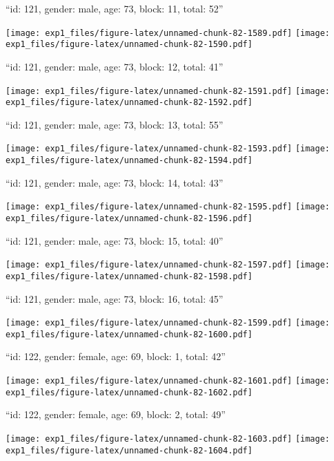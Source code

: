 \documentclass[11pt,,]{article}
\begin{document}
\newpage
[1] 

``id: 121, gender: male, age: 73, block: 11, total: 52''

\texttt{[image: exp1\_files/figure-latex/unnamed-chunk-82-1589.pdf]}
\texttt{[image: exp1\_files/figure-latex/unnamed-chunk-82-1590.pdf]}

\newpage
[1] 

``id: 121, gender: male, age: 73, block: 12, total: 41''

\texttt{[image: exp1\_files/figure-latex/unnamed-chunk-82-1591.pdf]}
\texttt{[image: exp1\_files/figure-latex/unnamed-chunk-82-1592.pdf]}

\newpage
[1] 

``id: 121, gender: male, age: 73, block: 13, total: 55''

\texttt{[image: exp1\_files/figure-latex/unnamed-chunk-82-1593.pdf]}
\texttt{[image: exp1\_files/figure-latex/unnamed-chunk-82-1594.pdf]}

\newpage
[1] 

``id: 121, gender: male, age: 73, block: 14, total: 43''

\texttt{[image: exp1\_files/figure-latex/unnamed-chunk-82-1595.pdf]}
\texttt{[image: exp1\_files/figure-latex/unnamed-chunk-82-1596.pdf]}

\newpage
[1] 

``id: 121, gender: male, age: 73, block: 15, total: 40''

\texttt{[image: exp1\_files/figure-latex/unnamed-chunk-82-1597.pdf]}
\texttt{[image: exp1\_files/figure-latex/unnamed-chunk-82-1598.pdf]}

\newpage
[1] 

``id: 121, gender: male, age: 73, block: 16, total: 45''

\texttt{[image: exp1\_files/figure-latex/unnamed-chunk-82-1599.pdf]}
\texttt{[image: exp1\_files/figure-latex/unnamed-chunk-82-1600.pdf]}

\newpage
[1] 

``id: 122, gender: female, age: 69, block: 1, total: 42''

\texttt{[image: exp1\_files/figure-latex/unnamed-chunk-82-1601.pdf]}
\texttt{[image: exp1\_files/figure-latex/unnamed-chunk-82-1602.pdf]}

\newpage
[1] 

``id: 122, gender: female, age: 69, block: 2, total: 49''

\texttt{[image: exp1\_files/figure-latex/unnamed-chunk-82-1603.pdf]}
\texttt{[image: exp1\_files/figure-latex/unnamed-chunk-82-1604.pdf]}
\end{document}
